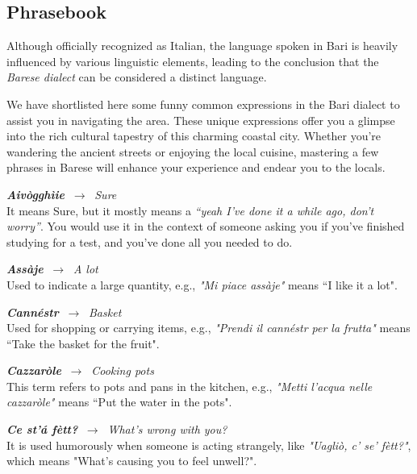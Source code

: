 \documentclass[
	openany, %
	parskip=full, %
	12pt, %
	a4paper, %
]{conferencebooklet} %
\begin{document}
\newpage
\begin{adjustwidth}{8pt}{12pt}
\section{Phrasebook}
Although officially recognized as Italian, the language spoken in Bari is heavily influenced by various linguistic elements, leading to the conclusion that the \textit{Barese dialect} can be considered a distinct language.

\vspace{-3mm}
We have shortlisted here some funny common expressions in the Bari dialect to assist you in navigating the area.
These unique expressions offer you a glimpse into the rich cultural tapestry of this charming coastal city. Whether you're wandering the ancient streets or enjoying the local cuisine, mastering a few phrases in Barese will enhance your experience and endear you to the locals.

\vspace{5mm}
\begin{multicols}{2}
    \RaggedRight
    \textbf{\textit{Aivògghìie}} $\ \rightarrow \ $ \textit{Sure} \\
    \justifying
    It means Sure, but it mostly means a \textit{“yeah I’ve done it a while ago, don’t worry”}. You would use it in the context of someone asking you if you’ve finished studying for a test, and you’ve done all you needed to do.

    \RaggedRight
    \textbf{\textit{Assàje}} $\ \rightarrow \ $ \textit{A lot} \\
    \justifying
    Used to indicate a large quantity, e.g., \textit{"Mi piace assàje"} means “I like it a lot".

    \RaggedRight
    \textbf{\textit{Cannéstr}} $\ \rightarrow \ $ \textit{Basket} \\
    \justifying
    Used for shopping or carrying items, e.g., \textit{"Prendi il cannéstr per la frutta"} means “Take the basket for the fruit".

    \RaggedRight
    \textbf{\textit{Cazzaròle}} $\ \rightarrow \ $ \textit{Cooking pots} \\
    \justifying
    This term refers to pots and pans in the kitchen, e.g., \textit{"Metti l'acqua nelle cazzaròle"} means “Put the water in the pots".

    \RaggedRight
    \textbf{\textit{Ce st’á fètt?}} $\ \rightarrow \ $ \textit{What’s wrong with you?} \\
    \justifying
    It is used humorously when someone is acting strangely, like \textit{"Uagliò, c’ se’ fètt?"}, which means "What's causing you to feel unwell?".


\end{multicols}
\end{adjustwidth}
\end{document}
